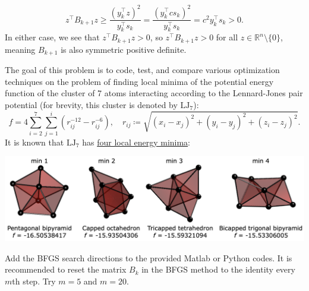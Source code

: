 \documentclass{../kin_math}
\begin{document}
\begin{questions}
\begin{enumerate}
\begin{solution}
      \begin{equation*}
        z^\top B_{k + 1} z \geq \frac{(y_k^\top z)^2}{y_k^\top s_k} = \frac{(y_k^\top c s_k)^2}{y_k^\top s_k} = c^2 y_k^\top s_k > 0.
      \end{equation*}
      In either case, we see that $z^\top B_{k + 1} z > 0$, so $z^\top B_{k + 1} z > 0$ for all $z \in \mathbb{R}^n \setminus \{0\}$, meaning $B_{k + 1}$ is also symmetric positive definite.
    \end{solution}
  \end{enumerate}

  \question The goal of this problem is to code, test, and compare various optimization techniques on the problem of finding local minima of the potential energy function of the cluster of 7 atoms interacting according to the Lennard-Jones pair potential (for brevity, this cluster is denoted by $\text{LJ}_7$):
  \begin{equation}
    f = 4 \sum_{i = 2}^7 \sum_{j = 1}^i \left(r_{ij}^{-12} - r_{ij}^{-6}\right), \quad r_{ij} \coloneqq \sqrt{(x_i - x_j)^2 + (y_i - y_j)^2 + (z_i - z_j)^2}.
  \end{equation}
  It is known that $\text{LJ}_7$ has \href{https://doi.org/10.1063/1.475008}{four local energy minima}:
  \begin{center}
    \includegraphics[scale=0.25]{minima.png}
  \end{center}
  Add the BFGS search directions to the provided Matlab or Python codes. It is recommended to reset the matrix $B_k$ in the BFGS method to the identity every $m$th step. Try $m = 5$ and $m = 20$.


\end{questions}
\end{document}
